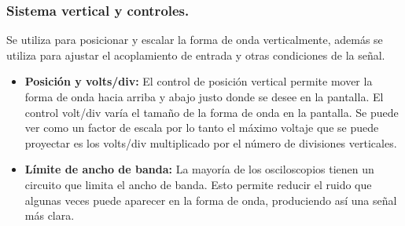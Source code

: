 \documentclass[12pt,letterpaper]{report}
\begin{document}
\subsubsection{Sistema vertical y controles.} Se utiliza para posicionar y escalar la forma de onda verticalmente, además se utiliza para ajustar el acoplamiento de entrada y otras condiciones de la señal.
\begin{itemize}
\item \textbf{Posición y volts/div: } El control de posición vertical permite mover la forma de onda hacia arriba y abajo justo donde se desee en la pantalla. El control volt/div varía el tamaño de la forma de onda en la pantalla. Se puede ver como un factor de escala por lo tanto el máximo voltaje que se puede proyectar es los volts/div multiplicado por el número de divisiones verticales.
\item \textbf{Límite de ancho de banda:} La mayoría de los osciloscopios tienen un circuito que limita el ancho de banda. Esto permite reducir el ruido que algunas veces puede aparecer en la forma de onda, produciendo así una señal más clara.
\end{itemize}
\end{document}
